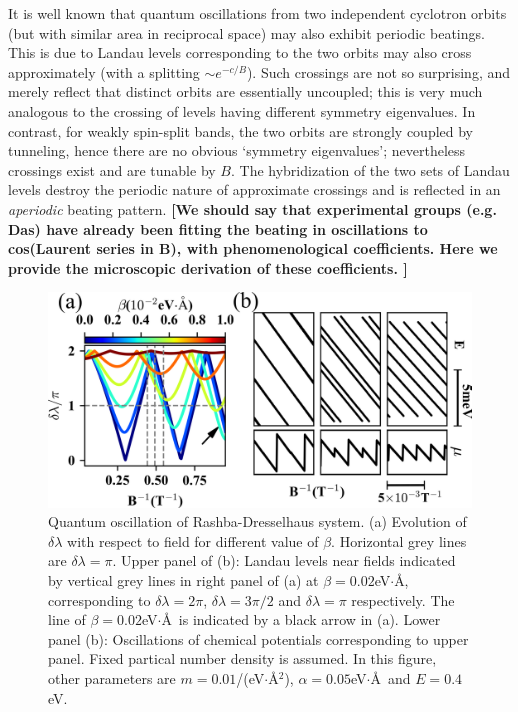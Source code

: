 \documentclass[aps, prb, showpacs, twocolumn, notitlepage, superscriptaddress]{revtex4-1}
\begin{document}
It is well known that quantum oscillations from two independent cyclotron orbits (but with similar area in reciprocal space) may also exhibit periodic beatings. This is due to Landau levels corresponding to the two orbits may also cross approximately (with a splitting $\sim e^{-c/B}$). Such crossings are not so surprising, and merely reflect that distinct orbits are essentially uncoupled; this is very much analogous to the crossing of levels having different symmetry eigenvalues. In contrast, for weakly spin-split bands, the two orbits are strongly coupled by tunneling, hence there are no obvious `symmetry eigenvalues'; nevertheless crossings exist and are tunable by $B$. The hybridization of the two sets of Landau levels destroy the periodic nature of approximate crossings and is reflected in an \emph{aperiodic} beating pattern.
\textbf{
[We should say that experimental groups (e.g. Das) have already been fitting the beating in oscillations to cos(Laurent series in B), with phenomenological coefficients. Here we provide the microscopic derivation of these coefficients.  ]}


\begin{figure}
\includegraphics[width=1.0\columnwidth]{qo.png}
\caption{Quantum oscillation of Rashba-Dresselhaus system. (a) Evolution of $\delta\lambda$ with respect to field for different value of $\beta$. Horizontal grey lines are $\delta\lambda=\pi$. Upper panel of (b): Landau levels near fields indicated by vertical grey lines in right panel of (a) at $\beta=0.02$eV$\cdot$\AA, corresponding to $\delta\lambda=2\pi$, $\delta\lambda=3\pi/2$ and $\delta\lambda=\pi$ respectively. The line of $\beta=0.02$eV$\cdot$\AA~is indicated by a black arrow in (a). Lower panel (b): Oscillations of chemical potentials corresponding to upper panel. Fixed partical number density is assumed. In this figure, other parameters are $m=0.01$/(eV$\cdot$\AA$^2$), $\alpha=0.05$eV$\cdot$\AA~and $E=0.4$eV.
\label{fig:qo}}
\end{figure}
\end{document}
